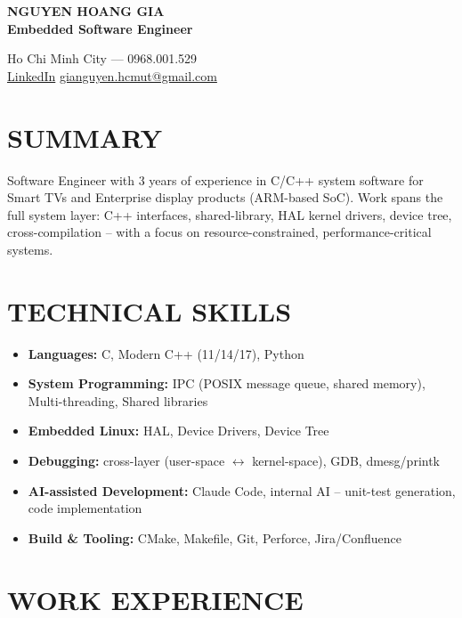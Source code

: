\documentclass[a4paper,10pt]{article}
\begin{document}
\pagestyle{empty}

\begin{minipage}[t]{0.55\textwidth}
    {\LARGE \textbf{NGUYEN HOANG GIA}} \\[5pt]
    {\large \textbf{Embedded Software Engineer}}
\end{minipage}%
\begin{minipage}[t]{0.45\textwidth}
    \raggedleft
    \vspace{2pt}
    Ho Chi Minh City --- 0968.001.529 \\
    \href{https://www.linkedin.com/in/gia-nguyen-6a007b294/}{LinkedIn} \textbar{} \href{mailto:gianguyen.hcmut@gmail.com}{gianguyen.hcmut@gmail.com}
\end{minipage}

\vspace{4pt}

\section*{SUMMARY}
Software Engineer with 3 years of experience in C/C++ system software for Smart TVs and Enterprise display products (ARM-based SoC). 
Work spans the full system layer: C++ interfaces, shared-library, HAL kernel drivers, device tree, cross-compilation -- with a focus on 
resource-constrained, performance-critical systems.

\section*{TECHNICAL SKILLS}
\begin{itemize}
    \item \textbf{Languages:} C, Modern C++ (11/14/17), Python
    \item \textbf{System Programming:} IPC (POSIX message queue, shared memory),
    Multi-threading, Shared libraries
    \item \textbf{Embedded Linux:} HAL, Device Drivers, Device Tree
    \item \textbf{Debugging:} cross-layer (user-space $\leftrightarrow$ kernel-space), GDB, dmesg/printk
    \item \textbf{AI-assisted Development:} Claude Code, internal AI -- unit-test generation,
    code implementation
    \item \textbf{Build \& Tooling:} CMake, Makefile, Git, Perforce, Jira/Confluence
\end{itemize}

\section*{WORK EXPERIENCE}
\end{document}
